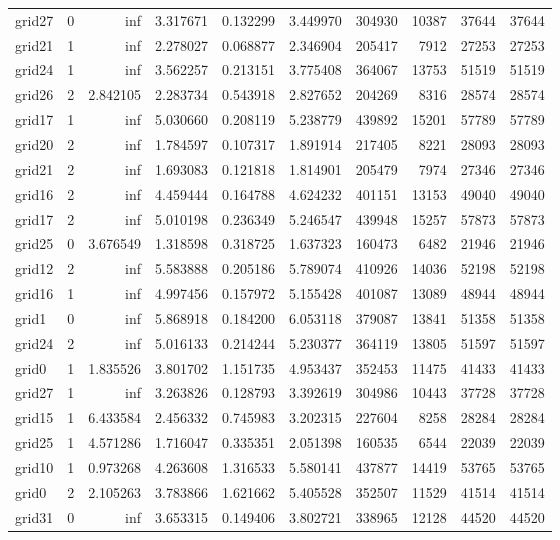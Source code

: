 \begin{longtable}{|l|r|r|r|r|r|r|r|r|r|}
grid27 & 0 & inf & 3.317671 & 0.132299 & 3.449970 & 304930 & 10387 & 37644 & 37644 \\
grid21 & 1 & inf & 2.278027 & 0.068877 & 2.346904 & 205417 & 7912 & 27253 & 27253 \\
grid24 & 1 & inf & 3.562257 & 0.213151 & 3.775408 & 364067 & 13753 & 51519 & 51519 \\
grid26 & 2 & 2.842105 & 2.283734 & 0.543918 & 2.827652 & 204269 & 8316 & 28574 & 28574 \\
grid17 & 1 & inf & 5.030660 & 0.208119 & 5.238779 & 439892 & 15201 & 57789 & 57789 \\
grid20 & 2 & inf & 1.784597 & 0.107317 & 1.891914 & 217405 & 8221 & 28093 & 28093 \\
grid21 & 2 & inf & 1.693083 & 0.121818 & 1.814901 & 205479 & 7974 & 27346 & 27346 \\
grid16 & 2 & inf & 4.459444 & 0.164788 & 4.624232 & 401151 & 13153 & 49040 & 49040 \\
grid17 & 2 & inf & 5.010198 & 0.236349 & 5.246547 & 439948 & 15257 & 57873 & 57873 \\
grid25 & 0 & 3.676549 & 1.318598 & 0.318725 & 1.637323 & 160473 & 6482 & 21946 & 21946 \\
grid12 & 2 & inf & 5.583888 & 0.205186 & 5.789074 & 410926 & 14036 & 52198 & 52198 \\
grid16 & 1 & inf & 4.997456 & 0.157972 & 5.155428 & 401087 & 13089 & 48944 & 48944 \\
grid1 & 0 & inf & 5.868918 & 0.184200 & 6.053118 & 379087 & 13841 & 51358 & 51358 \\
grid24 & 2 & inf & 5.016133 & 0.214244 & 5.230377 & 364119 & 13805 & 51597 & 51597 \\
grid0 & 1 & 1.835526 & 3.801702 & 1.151735 & 4.953437 & 352453 & 11475 & 41433 & 41433 \\
grid27 & 1 & inf & 3.263826 & 0.128793 & 3.392619 & 304986 & 10443 & 37728 & 37728 \\
grid15 & 1 & 6.433584 & 2.456332 & 0.745983 & 3.202315 & 227604 & 8258 & 28284 & 28284 \\
grid25 & 1 & 4.571286 & 1.716047 & 0.335351 & 2.051398 & 160535 & 6544 & 22039 & 22039 \\
grid10 & 1 & 0.973268 & 4.263608 & 1.316533 & 5.580141 & 437877 & 14419 & 53765 & 53765 \\
grid0 & 2 & 2.105263 & 3.783866 & 1.621662 & 5.405528 & 352507 & 11529 & 41514 & 41514 \\
grid31 & 0 & inf & 3.653315 & 0.149406 & 3.802721 & 338965 & 12128 & 44520 & 44520 \\

\end{longtable}

